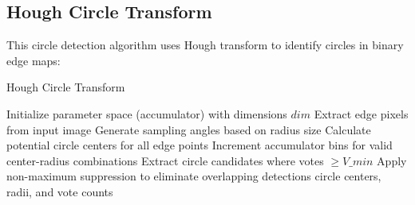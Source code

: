 \documentclass[12pt,a4paper]{article}
\begin{document}
\subsection{Hough Circle Transform} \label{subsec:hough_impl}

This circle detection algorithm uses  Hough transform to identify circles in binary edge maps:

\begin{algorithm}[H]
    \caption{Hough Circle Transform}
    \begin{algorithmic}[1]
            \State Initialize parameter space (accumulator) with dimensions $dim$
            \State Extract edge pixels from input image
                \State Generate sampling angles based on radius size
                \State Calculate potential circle centers for all edge points
                \State Increment accumulator bins for valid center-radius combinations
            \EndFor
            \State Extract circle candidates where votes $\geq V\_min$
            \State Apply non-maximum suppression to eliminate overlapping detections
            \State \Return circle centers, radii, and vote counts
        \EndFunction
    \end{algorithmic}
\end{algorithm}
\end{document}
